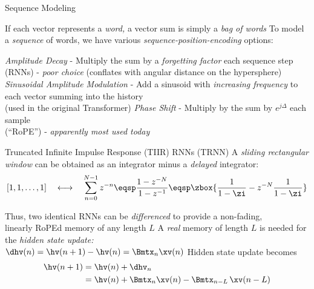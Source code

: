 \begin{slide}[\slideopts,toc={Sequences}]{Sequence Modeling}
  \vspace{-1em}
  \begin{itemize}
    \mpitem If each vector represents a \emph{word,} a vector sum is simply a \emph{bag of words}
    \mpitem To model a \emph{sequence} of words, we have various \emph{sequence-position-encoding} options:
    \begin{enumerate}
      \mpitem \emph{Amplitude Decay} - Multiply the sum by a \emph{forgetting factor} each sequence step\\
      (RNNs) - \emph{poor choice} (conflates with angular distance on the hypersphere)
      \mpitem \emph{Sinusoidal Amplitude Modulation} - Add a sinusoid with \emph{increasing frequency} to each vector summing into the history\\
      (used in the original Transformer)
      \mpitem \emph{Phase Shift} - Multiply by the sum by $e^{j\Delta}$ each sample\\
      (``RoPE'') - \emph{apparently most used today}
    \end{enumerate}
  \end{itemize}
\end{slide}

%

\begin{slide}[\slideopts,toc={TIIR RNNs}]{Truncated Infinite Impulse Response (TIIR) RNNs (TRNN)}
  A \emph{sliding rectangular window} can be obtained as an integrator minus a \emph{delayed} integrator:
  \[
  [1,1,\ldots, 1] \quad\longleftrightarrow\quad \sum_{n=0}^{N-1} z^{-n} \eqsp \frac{1-z^{-N}}{1-z^{-1}} \eqsp \zbox{\frac{1}{1-\zi} - z^{-N}\frac{1}{1-\zi}}
  \]
  \begin{itemize}
    \mpitem Thus, two identical RNNs can be \emph{differenced} to provide a non-fading,\\
            linearly RoPEd memory of any length $L$
            \mpitem A \emph{real} memory of length $L$ is needed for the \emph{hidden state update:}\\
            $\dhv(n) = \hv(n+1)-\hv(n) = \Bmtx_n\xv(n)$
    \mpitem Hidden state update becomes
    \vspace{-1em}
    \begin{align*}
    \hv(n+1) &= \hv(n) + \dhv_n\\
             &= \hv(n) + \Bmtx_n\xv(n) - \Bmtx_{n-L}\, \xv(n-L)
    \end{align*}
    \vspace{-1em}
  \end{itemize}
\end{slide}

